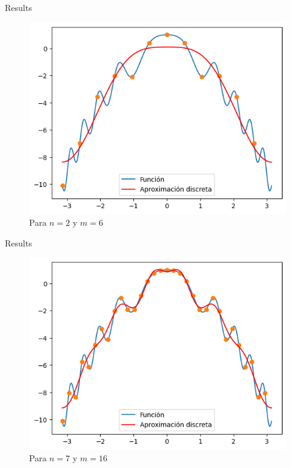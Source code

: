 \begin{frame}{Results}
    \begin{figure}
        \centering
        \includegraphics[width=.5\paperwidth]{p7-Aprox-discreta.png}
        \caption{Para $n=2$ y $m=6$}
        \label{fig:enter-label}
    \end{figure}
\end{frame}

\begin{frame}{Results}
    \begin{figure}
        \centering
        \includegraphics[width=.5\paperwidth]{p7-A-discreta2.png}
        \caption{Para $n=7$ y $m=16$}
        \label{fig:enter-label}
    \end{figure}
\end{frame}

